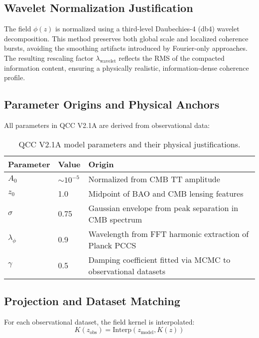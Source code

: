 \documentclass[12pt]{article}
\begin{document}
\subsection*{Wavelet Normalization Justification}

The field \(\phi(z)\) is normalized using a third-level Daubechies-4 (db4) wavelet decomposition. This method preserves both global scale and localized coherence bursts, avoiding the smoothing artifacts introduced by Fourier-only approaches. The resulting rescaling factor \(\lambda_{\text{wavelet}}\) reflects the RMS of the compacted information content, ensuring a physically realistic, information-dense coherence profile.

\subsection*{Parameter Origins and Physical Anchors}

All parameters in QCC V2.1A are derived from observational data:

\begin{table}[h!]
	\centering
	\begin{tabular}{l l l}
		\textbf{Parameter} & \textbf{Value} & \textbf{Origin} \\
		\hline
		\(A_0\) & \(\sim 10^{-5}\) & Normalized from CMB TT amplitude \\
		\(z_0\) & 1.0 & Midpoint of BAO and CMB lensing features \\
		\(\sigma\) & 0.75 & Gaussian envelope from peak separation in CMB spectrum \\
		\(\lambda_{\phi}\) & 0.9 & Wavelength from FFT harmonic extraction of Planck PCCS \\
		\(\gamma\) & 0.5 & Damping coefficient fitted via MCMC to observational datasets \\
	\end{tabular}
	\caption{QCC V2.1A model parameters and their physical justifications.}
\end{table}

\subsection{Projection and Dataset Matching}
For each observational dataset, the field kernel is interpolated:
\begin{equation}
K(z_{\text{obs}}) = \text{Interp}(z_{\text{model}}, K(z))
\end{equation}
\end{document}
